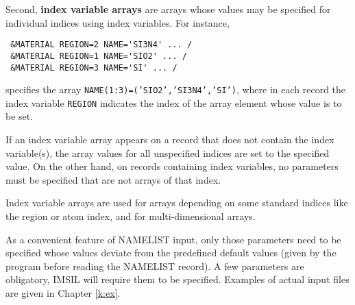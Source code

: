 Second, \textbf{index variable arrays} are arrays whose values may be specified
for individual indices using index variables. For instance,
%
\begin{samepage}
\begin{verbatim}
 &MATERIAL REGION=2 NAME='SI3N4' ... /
 &MATERIAL REGION=1 NAME='SIO2' ... /
 &MATERIAL REGION=3 NAME='SI' ... /
\end{verbatim}
\end{samepage}
%
specifies the array \texttt{NAME(1:3)=('SIO2','SI3N4','SI')}, where in each
record the index variable \texttt{REGION} indicates the index of the array
element whose value is to be set.

If an index variable array appears on a record that does not contain the index
variable(s), the array values for all unspecified indices are set to the
specified value. On the other hand, on records containing index
variables, no parameters must be specified that are not arrays of that index. 

Index variable arrays are used for arrays depending on some standard indices
like the region or atom index, and for multi-dimensional arrays. 

As a convenient feature of NAMELIST input, only those parameters need to be
specified whose values deviate from the predefined default values (given by the
program before reading the NAMELIST record). A few parameters are obligatory,
IMSIL will require them to be specified. Examples of actual input files are
given in Chapter \ref{k:ex}.

